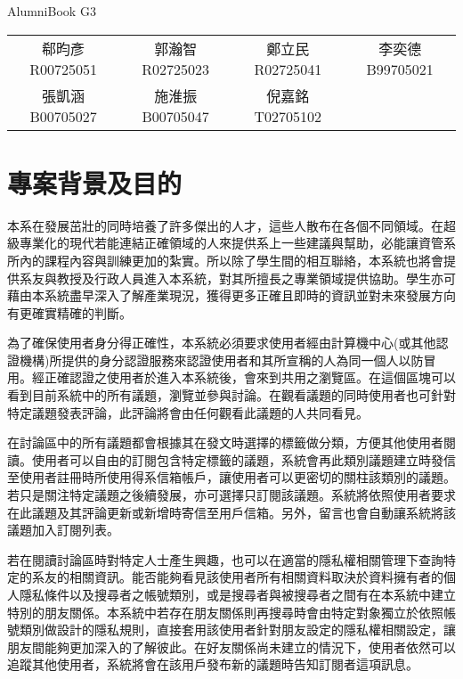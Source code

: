 \documentclass[11pt]{article}
\begin{document}
\begin{center}{\Huge AlumniBook} {G3} \end{center}

\begin{center}
\begin{tabular}{cccc}
郗昀彥 R00725051&郭瀚智 R02725023&鄭立民 R02725041&李奕德 B99705021 \\
張凱涵 B00705027&施淮振 B00705047&倪嘉銘 T02705102&
\end{tabular}
\noindent\makebox[\linewidth]{\rule{\linewidth}{0.4pt}}
\end{center}

\tableofcontents

\section{專案背景及目的}

本系在發展茁壯的同時培養了許多傑出的人才，這些人散布在各個不同領域。在超級專業化的現代若能連結正確領域的人來提供系上一些建議與幫助，必能讓資管系所內的課程內容與訓練更加的紮實。所以除了學生間的相互聯絡，本系統也將會提供系友與教授及行政人員進入本系統，對其所擅長之專業領域提供協助。學生亦可藉由本系統盡早深入了解產業現況，獲得更多正確且即時的資訊並對未來發展方向有更確實精確的判斷。

為了確保使用者身分得正確性，本系統必須要求使用者經由計算機中心(或其他認證機構)所提供的身分認證服務來認證使用者和其所宣稱的人為同一個人以防冒用。經正確認證之使用者於進入本系統後，會來到共用之瀏覽區。在這個區塊可以看到目前系統中的所有議題，瀏覽並參與討論。在觀看議題的同時使用者也可針對特定議題發表評論，此評論將會由任何觀看此議題的人共同看見。

在討論區中的所有議題都會根據其在發文時選擇的標籤做分類，方便其他使用者閱讀。使用者可以自由的訂閱包含特定標籤的議題，系統會再此類別議題建立時發信至使用者註冊時所使用得系信箱帳戶，讓使用者可以更密切的關柱該類別的議題。若只是關注特定議題之後續發展，亦可選擇只訂閱該議題。系統將依照使用者要求在此議題及其評論更新或新增時寄信至用戶信箱。另外，留言也會自動讓系統將該議題加入訂閱列表。

若在閱讀討論區時對特定人士產生興趣，也可以在適當的隱私權相關管理下查詢特定的系友的相關資訊。能否能夠看見該使用者所有相關資料取決於資料擁有者的個人隱私條件以及搜尋者之帳號類別，或是搜尋者與被搜尋者之間有在本系統中建立特別的朋友關係。本系統中若存在朋友關係則再搜尋時會由特定對象獨立於依照帳號類別做設計的隱私規則，直接套用該使用者針對朋友設定的隱私權相關設定，讓朋友間能夠更加深入的了解彼此。在好友關係尚未建立的情況下，使用者依然可以追蹤其他使用者，系統將會在該用戶發布新的議題時告知訂閱者這項訊息。
\end{document}
